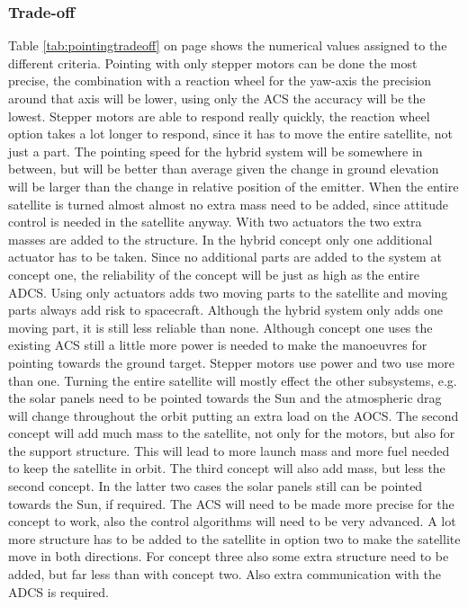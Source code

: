 \subsubsection{Trade-off}
Table \ref{tab:pointingtradeoff} on page \pageref{tab:pointingtradeoff} shows the numerical values assigned to the different criteria. 
Pointing with only stepper motors can be done the most precise, the combination with a reaction wheel for the yaw-axis the precision around that axis will be lower, using only the \ac{ACS} the accuracy will be the lowest. 
Stepper motors are able to respond really quickly, the reaction wheel option takes a lot longer to respond, since it has to move the entire satellite, not just a part. The pointing speed for the hybrid system will be somewhere in between, but will be better than average given the change in ground elevation will be larger than the change in relative position of the emitter.
When the entire satellite is turned almost almost no extra mass need to be added, since attitude control is needed in the satellite anyway. With two actuators the two extra masses are added to the structure. In the hybrid concept only one additional actuator has to be taken.
Since no additional parts are added to the system at concept one, the reliability of the concept will be just as high as the entire \ac{ADCS}. Using only actuators adds two moving parts to the satellite and moving parts always add risk to spacecraft. Although the hybrid system only adds one moving part, it is still less reliable than none.
Although concept one uses the existing \ac{ACS} still a little more power is needed to make the manoeuvres for pointing towards the ground target. Stepper motors use power and two use more than one.
Turning the entire satellite will mostly effect the other subsystems, e.g. the solar panels need to be pointed towards the Sun and the atmospheric drag will change throughout the orbit putting an extra load on the \ac{AOCS}. The second concept will add much mass to the satellite, not only for the motors, but also for the support structure. This will lead to more launch mass and more fuel needed to keep the satellite in orbit. The third concept will also add mass, but less the second concept. In the latter two cases the solar panels still can be pointed towards the Sun, if required.
The \ac{ACS} will need to be made more precise for the concept to work, also the control algorithms will need to be very advanced. A lot more structure has to be added to the satellite in option two to make the satellite move in both directions. For concept three also some extra structure need to be added, but far less than with concept two. Also extra communication with the \ac{ADCS} is required.

